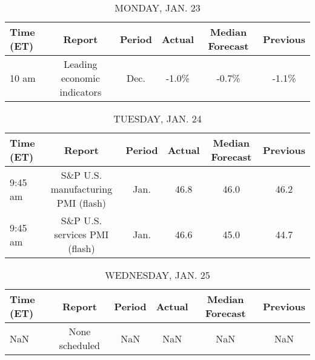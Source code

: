 \documentclass{article}%
\begin{document}
%
\normalsize%


\begin{table}[htbp]%
\caption{MONDAY, JAN. 23}%
\centering%
\begin{adjustbox}{width=1\textwidth}%
\begin{tabular}{lccccc}
\toprule
Time (ET) &                      Report & Period & Actual & Median Forecast & Previous \\
\midrule
    10 am & Leading economic indicators &   Dec. &  -1.0\% &           -0.7\% &    -1.1\% \\
\bottomrule
\end{tabular}
%
\end{adjustbox}%
\end{table}

%


\begin{table}[htbp]%
\caption{TUESDAY, JAN. 24}%
\centering%
\begin{adjustbox}{width=1\textwidth}%
\begin{tabular}{lccccc}
\toprule
Time (ET) &                             Report & Period & Actual & Median Forecast & Previous \\
\midrule
  9:45 am & S\&P U.S. manufacturing PMI (flash) &   Jan. &   46.8 &            46.0 &     46.2 \\
  9:45 am &      S\&P U.S. services PMI (flash) &   Jan. &   46.6 &            45.0 &     44.7 \\
\bottomrule
\end{tabular}
%
\end{adjustbox}%
\end{table}

%


\begin{table}[htbp]%
\caption{WEDNESDAY, JAN. 25}%
\centering%
\begin{adjustbox}{width=1\textwidth}%
\begin{tabular}{lccccc}
\toprule
Time (ET) &         Report & Period & Actual & Median Forecast & Previous \\
\midrule
      NaN & None scheduled &    NaN &    NaN &             NaN &      NaN \\
\bottomrule
\end{tabular}
%
\end{adjustbox}%
\end{table}

%
\end{document}
